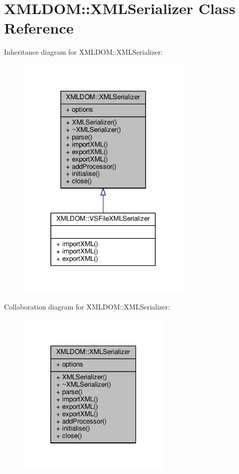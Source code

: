 \hypertarget{classXMLDOM_1_1XMLSerializer}{}\section{X\+M\+L\+D\+OM\+:\+:X\+M\+L\+Serializer Class Reference}
\label{classXMLDOM_1_1XMLSerializer}


Inheritance diagram for X\+M\+L\+D\+OM\+:\+:X\+M\+L\+Serializer\+:
\nopagebreak
\begin{figure}[H]
\begin{center}
\leavevmode
\includegraphics[width=236pt]{d6/db5/classXMLDOM_1_1XMLSerializer__inherit__graph}
\end{center}
\end{figure}


Collaboration diagram for X\+M\+L\+D\+OM\+:\+:X\+M\+L\+Serializer\+:
\nopagebreak
\begin{figure}[H]
\begin{center}
\leavevmode
\includegraphics[width=207pt]{d4/daf/classXMLDOM_1_1XMLSerializer__coll__graph}
\end{center}
\end{figure}
